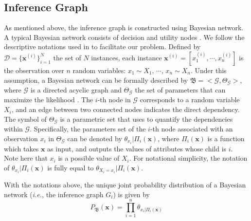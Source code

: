 \subsection{Inference Graph}
As mentioned above, the inference graph is constructed using Bayesian network.
A typical Bayesian network consists of decision and utility nodes \cite{Murphy2001}.
We follow the descriptive notations used in \cite{koller2009probabilistic} to facilitate our problem.
Defined by $\mathcal{D}=\{\mathbf{x}^{(i)}\}_{i=1}^N$ the set of $N$ instances, each instance $\mathbf{x}^{(i)}=[x_1^{(i)}, \cdots, x_n^{(i)}]$ is the observation over $n$ random variables: $x_1\sim X_1$, $\cdots$, $x_n\sim X_n$. 
Under this assumption, a Bayesian network can be formally described by $\mathfrak{B}=<\mathcal{G},\mathit{\Theta}_\mathcal{G}>$, where $\mathcal{G}$ is a directed acyclic graph and $\mathit{\Theta}_\mathcal{G}$ the set of parameters that can maximize the likelihood \cite{friedman1997bayesian, petitjean2018accurate}. 
The $i$-th node in $\mathcal{G}$ corresponds to a random variable ${X}_i$, and an edge between two connected nodes indicates the direct dependency. 
The symbol of $\mathit{\Theta}_\mathcal{G}$ is a parametric set that uses to quantify the dependencies within $\mathcal{G}$. %
Specifically, the parameters set of the $i$-th node associated with an observation $x_i$ in $\mathit{\Theta}_\mathcal{G}$ can be denoted by $\theta_{x_i}|\Pi_i(\mathbf{x})$, where $\Pi_i(\mathbf{x})$ is a function which takes $\mathbf{x}$ as input, and outputs the values of attributes whose child is $i$.
Note here that ${x_i}$ is a possible value of $X_i$.
For notational simplicity, the notation of $\theta_{x_i}|\Pi_i(\mathbf{x})$ is fully equal to $\theta_{X_i=x_i}|\Pi_i(\mathbf{x})$.

With the notations above, the unique joint probability distribution of a Bayesian network (\textit{i.e.}, the inference graph $G_i$) is given by
\vspace{-1ex}
\begin{equation}\label{eq:BNOri}
P_\mathfrak{B}(\mathbf{x}) = \prod_{i=1}^{n}\theta_{x_i|\Pi_i(\mathbf{x})}
\end{equation}
\vspace{-1ex}

